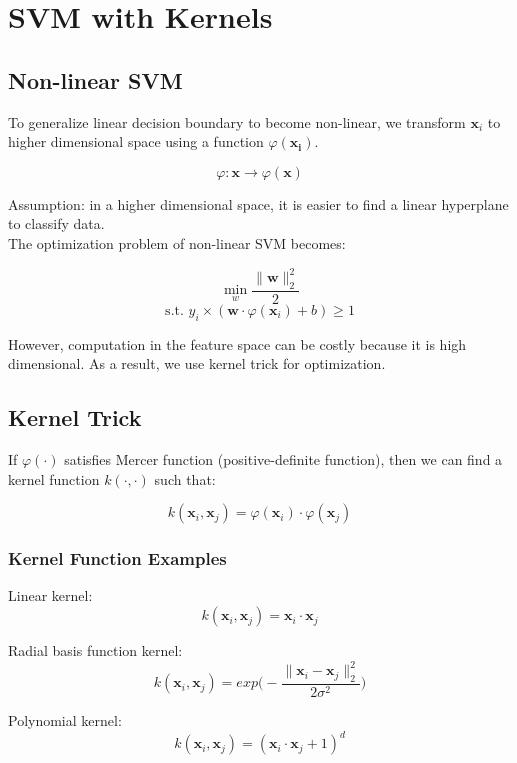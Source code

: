 \chapter{SVM with Kernels}

\begin{multicols}{2}

\section{Non-linear SVM}

\noindent To generalize linear decision boundary to become non-linear, we transform $\mathbf x_i$ to higher dimensional space using a function $\varphi(\mathbf{x_i})$.

$$\varphi : \mathbf{x} \rightarrow \varphi(\mathbf{x})$$

\noindent Assumption: in a higher dimensional space, it is easier to find a linear hyperplane to classify data. \\

\noindent The optimization problem of non-linear SVM becomes:

$$\!\min_w \frac{\| \mathbf{w} \|_2^2}{2}$$
$$\text{s.t. } y_i \times (\mathbf{w} \cdot \varphi(\mathbf{x}_i) + b) \ge 1$$

\noindent However, computation in the feature space can be costly because it is high dimensional. As a result, we use kernel trick for optimization. 

\section{Kernel Trick}

\noindent If $\varphi(\cdot)$ satisfies Mercer function (positive-definite function), then we can find a kernel function $k(\cdot,\cdot)$ such that:

$$k(\mathbf{x}_i, \mathbf{x}_j) = \varphi(\mathbf{x}_i)\cdot \varphi(\mathbf{x}_j)$$

\subsection{Kernel Function Examples}
\noindent Linear kernel:
$$k(\mathbf{x}_i,\mathbf{x}_j)=\mathbf{x}_i \cdot \mathbf{x}_j$$

\noindent Radial basis function kernel:
$$k(\mathbf{x}_i,\mathbf{x}_j)=exp\Big(-\frac{\|\mathbf{x}_i - \mathbf{x}_j\|_2^2}{2 \sigma^2} \Big)$$

\noindent Polynomial kernel:
$$k(\mathbf{x}_i,\mathbf{x}_j)=(\mathbf{x}_i\cdot \mathbf{x}_j + 1)^d$$


\end{multicols}
